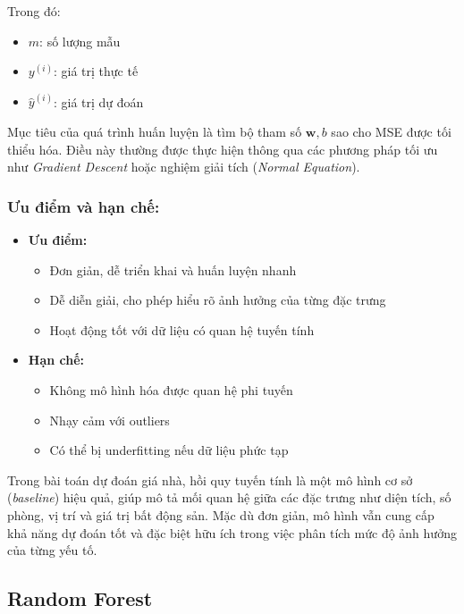 Trong đó:
\begin{itemize}
    \item $m$: số lượng mẫu
    \item $y^{(i)}$: giá trị thực tế
    \item $\hat{y}^{(i)}$: giá trị dự đoán
\end{itemize}

Mục tiêu của quá trình huấn luyện là tìm bộ tham số $\mathbf{w}, b$ sao cho MSE được tối thiểu hóa. Điều này thường được thực hiện thông qua các phương pháp tối ưu như \textit{Gradient Descent} hoặc nghiệm giải tích (\textit{Normal Equation}).

\subsubsection*{Ưu điểm và hạn chế:}

\begin{itemize}
    \item \textbf{Ưu điểm:}
    \begin{itemize}
        \item Đơn giản, dễ triển khai và huấn luyện nhanh
        \item Dễ diễn giải, cho phép hiểu rõ ảnh hưởng của từng đặc trưng
        \item Hoạt động tốt với dữ liệu có quan hệ tuyến tính
    \end{itemize}
    
    \item \textbf{Hạn chế:}
    \begin{itemize}
        \item Không mô hình hóa được quan hệ phi tuyến
        \item Nhạy cảm với outliers
        \item Có thể bị underfitting nếu dữ liệu phức tạp
    \end{itemize}
\end{itemize}

Trong bài toán dự đoán giá nhà, hồi quy tuyến tính là một mô hình cơ sở (\textit{baseline}) hiệu quả, giúp mô tả mối quan hệ giữa các đặc trưng như diện tích, số phòng, vị trí và giá trị bất động sản. Mặc dù đơn giản, mô hình vẫn cung cấp khả năng dự đoán tốt và đặc biệt hữu ích trong việc phân tích mức độ ảnh hưởng của từng yếu tố.

\subsection{Random Forest}


